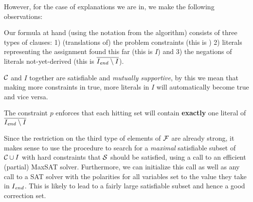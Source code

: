 However, for the case of explanations we are in, we make the following observations: 
\begin{compactitem}
 \item Our formula at hand (using the notation from the \onestepo algorithm) consists of three types of clauses: 1) (translations of) the problem constraints (this is \formulac) 2) literals representing the assignment found this far (this is $I$) and 3) the negations of literals not-yet-derived (this is $\overline{I_\mathit{end} \setminus I}$). 
 \item $\mathcal{C} $ and $I$ together are satisfiable and \emph{mutually supportive}, by this we mean that making more constraints in \formulac true, more literals in $I$ will automatically become true and vice versa. 
 \item The constraint $p$ enforces that each hitting set will contain \textbf{exactly} one literal of  $\overline{I_\mathit{end} \setminus I}$
\end{compactitem}
Since the restriction on the third type of elements of $\mathcal{F} $ are already strong, it makes sense to use the \grow procedure to search for a \emph{maximal} satisfiable subset of $\mathcal{C} \cup I$ with hard constraints that $\mathcal{S}$ should be satisfied, using a call to an efficient  (partial) MaxSAT solver. Furthermore, we can initialize this call as well as any call to a SAT solver with the polarities for all variables set to the value they take in $I_\mathit{end} $. This is likely to lead to a fairly large satisfiable subset and hence a good correction set. 






